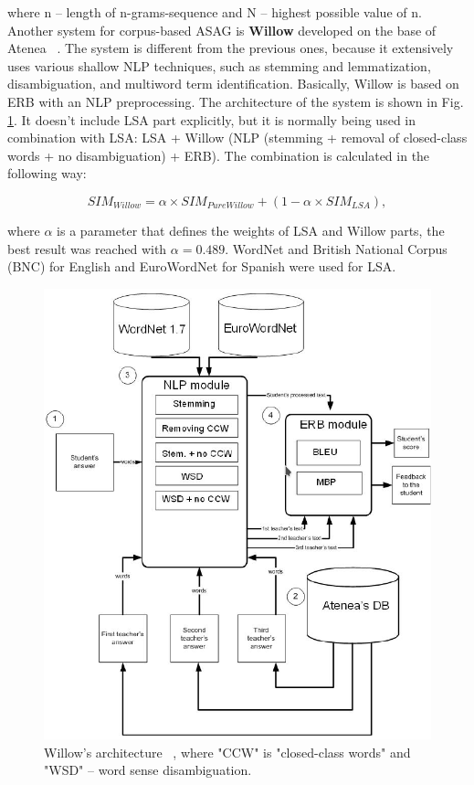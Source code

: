 where n -- length of n-grams-sequence and N -- highest possible value of n. \\

Another system for corpus-based ASAG is \textbf{Willow} developed on the base of Atenea ~\cite{Willow}. The system is different from the previous ones, because it extensively uses various shallow NLP techniques, such as stemming and lemmatization, disambiguation, and multiword term identification. Basically, Willow is based on ERB with an NLP preprocessing. The architecture of the system is shown in Fig. \ref{fig:WillowArch}. It doesn't include LSA part explicitly, but it is normally being used in combination with LSA: LSA + Willow (NLP (stemming + removal of closed-class words + no disambiguation) + ERB). The combination is calculated in the following way:

\begin{equation} \label{eq:Willow}
SIM_{Willow} = \alpha \times SIM_{PureWillow} + (1 - \alpha \times SIM_{LSA}),
\end{equation}

where $\alpha$ is a parameter that defines the weights of LSA and Willow parts, the best result was reached with $\alpha = 0.489$. WordNet and British National Corpus (BNC) for English and EuroWordNet for Spanish were used for LSA.\\

 \begin{figure}[h!]
  \centering
  \includegraphics[width=\textwidth]{img/WillowArch}
    \caption{ Willow's architecture ~\cite{Willow}, where "CCW" is "closed-class words" and "WSD" -- word sense disambiguation.}\label{fig:WillowArch}
\end{figure}

